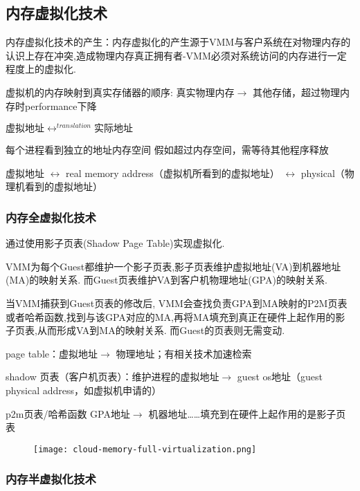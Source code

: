 \subsection{内存虚拟化技术}

内存虚拟化技术的产生：内存虚拟化的产生源于VMM与客户系统在对物理内存的认识上存在冲突,造成物理内存真正拥有者-VMM必须对系统访问的内存进行一定程度上的虚拟化. 

虚拟机的内存映射到真实存储器的顺序: 真实物理内存$\rightarrow$ 其他存储，️超过物理内存时performance下降

$虚拟地址\leftrightarrow^{translation}实际地址$

每个进程看到独立的地址内存空间
假如超过内存空间，需等待其他程序释放

虚拟地址 $\leftrightarrow$ real memory address（虚拟机所看到的虚拟地址） $\leftrightarrow$ physical（物理机看到的虚拟地址）

\subsubsection{内存全虚拟化技术}

通过使用影子页表(Shadow Page Table)实现虚拟化. 

VMM为每个Guest都维护一个影子页表,影子页表维护虚拟地址(VA)到机器地址(MA)的映射关系. 而Guest页表维护VA到客户机物理地址(GPA)的映射关系. 

当VMM捕获到Guest页表的修改后, VMM会查找负责GPA到MA映射的P2M页表或者哈希函数,找到与该GPA对应的MA,再将MA填充到真正在硬件上起作用的影子页表,从而形成VA到MA的映射关系. 而Guest的页表则无需变动. 

page table：虚拟地址$\rightarrow$ 物理地址；有相关技术加速检索

shadow 页表（客户机页表）：维护进程的虚拟地址$\rightarrow$ guest os地址（guest physical address，如虚拟机申请的）

p2m页表/哈希函数 GPA地址$\rightarrow$ 机器地址……填充到在硬件上起作用的是影子页表


\begin{figure}[htbp]
    \begin{center}
        \texttt{[image: cloud-memory-full-virtualization.png]}
    \end{center}
\end{figure}


\subsubsection{内存半虚拟化技术}

